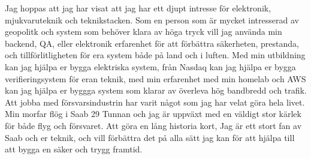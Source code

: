 \documentclass[../../main.tex]{subfiles}
\begin{document}
Jag hoppas att jag har visat att jag har ett djupt intresse för elektronik, mjukvaruteknik och teknikstacken. Som en person som är mycket intresserad av geopolitk och system som behöver klara av höga tryck vill jag använda min backend, QA, eller elektronik erfarenhet för att förbättra säkerheten, prestanda, och tillförlitligheten för era system både på land och i luften. Med min utbildning kan jag hjälpa er bygga elektriska system, från Nasdaq kan jag hjälpa er bygga verifieringsystem för eran teknik, med min erfarenhet med min homelab och AWS kan jag hjälpa er byggga system som klarar av överleva hög bandbredd och trafik. Att jobba med försvarsindustrin har varit något som jag har velat göra hela livet. Min morfar flög i Saab 29 Tunnan och jag är uppväxt med en väldigt stor kärlek för både flyg och försvaret. Att göra en lång historia kort, Jag är ett stort fan av Saab och er teknik, och vill förbättra det på alla sätt jag kan för att hjälpa till att bygga en säker och trygg framtid.
\\
\end{document}
